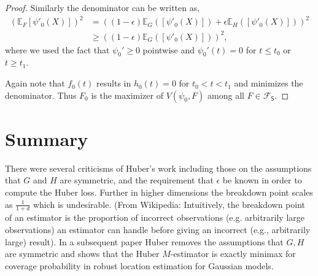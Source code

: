 \documentclass{article}
\renewcommand{\E}{\ensuremath{\mathbb{E}}}
\newcommand{\Ep}{\ensuremath{\mathbb{E}_F}}
\begin{document}
\begin{proof}
Similarly the denominator can be written as,
\begin{align*}
    (\Ep[\psi'_0(X)])^2 &= ((1-\epsilon) \E_G([\psi'_0(X)])+\epsilon \E_{H}([\psi'_0(X)]))^2 \\
    & \geq ((1-\epsilon) \E_G([\psi'_0(X)]))^2,
\end{align*}
where we used the fact that $\psi_0' \geq 0$ pointwise and $\psi_0'(t) = 0$ for $t \leq t_0$ or $t \geq t_1$.

Again note that $f_0(t)$ results in $h_0(t) = 0$ for $t_0 < t < t_1$ and minimizes the denominator. Thus $F_0$ is the maximizer of $V(\psi_0, F)$ among all $F\in \mathcal{F}_{\mathsf{S}}$. 
\end{proof}
\section{Summary}

There were several criticisms of Huber's work including those on the assumptions that $G$ and $H$ are symmetric, and the requirement that $\epsilon$ be known in order to compute the Huber loss. Further in higher dimensions the breakdown point scales as $\frac{1}{1+d}$ which is undesirable. (From Wikipedia: Intuitively, the breakdown point of an estimator is the proportion of incorrect observations (e.g. arbitrarily large observations) an estimator can handle before giving an incorrect (e.g., arbitrarily large) result). In a subsequent paper Huber removes the assumptions that $G, H$ are symmetric and shows that the Huber $M$-estimator is exactly minimax for coverage probability in robust location estimation for Gaussian models. 





\end{document}
